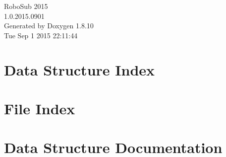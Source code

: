 \documentclass[twoside]{book}
\newcommand{\+}{\discretionary{\mbox{\scriptsize$\hookleftarrow$}}{}{}}
\newcommand{\clearemptydoublepage}{%
  \newpage{\pagestyle{empty}\cleardoublepage}%
}
\begin{document}
\hypersetup{pageanchor=false,
             bookmarks=true,
             bookmarksnumbered=true,
             pdfencoding=unicode
            }
\begin{titlepage}
\vspace*{7cm}
\begin{center}%
{\Large Robo\+Sub 2015 \\[1ex]\large 1.\+0.\+2015.\+0901 }\\
\vspace*{1cm}
{\large Generated by Doxygen 1.8.10}\\
\vspace*{0.5cm}
{\small Tue Sep 1 2015 22:11:44}\\
\end{center}
\end{titlepage}
\clearemptydoublepage
\tableofcontents
\clearemptydoublepage
{}
\hypersetup{pageanchor=true}

\chapter{Data Structure Index}

\chapter{File Index}

\chapter{Data Structure Documentation}






















\end{document}
